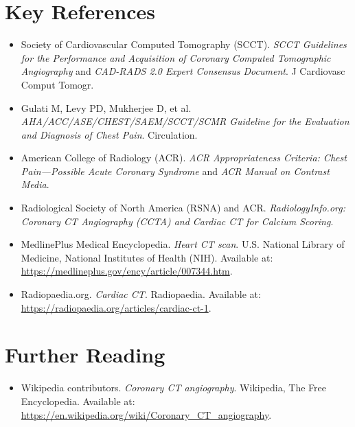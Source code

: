 \section{Key References}
\begin{itemize}
    \item Society of Cardiovascular Computed Tomography (SCCT). \textit{SCCT Guidelines for the Performance and Acquisition of Coronary Computed Tomographic Angiography} and \textit{CAD-RADS 2.0 Expert Consensus Document}. J Cardiovasc Comput Tomogr.
    \item Gulati M, Levy PD, Mukherjee D, et al. \textit{AHA/ACC/ASE/CHEST/SAEM/SCCT/SCMR Guideline for the Evaluation and Diagnosis of Chest Pain}. Circulation.
    \item American College of Radiology (ACR). \textit{ACR Appropriateness Criteria: Chest Pain---Possible Acute Coronary Syndrome} and \textit{ACR Manual on Contrast Media}.
    \item Radiological Society of North America (RSNA) and ACR. \textit{RadiologyInfo.org: Coronary CT Angiography (CCTA) and Cardiac CT for Calcium Scoring}.
    \item MedlinePlus Medical Encyclopedia. \textit{Heart CT scan}. U.S. National Library of Medicine, National Institutes of Health (NIH). Available at: \url{https://medlineplus.gov/ency/article/007344.htm}.
    \item Radiopaedia.org. \textit{Cardiac CT}. Radiopaedia. Available at: \url{https://radiopaedia.org/articles/cardiac-ct-1}.
\end{itemize}

\section{Further Reading}
\begin{itemize}
  \item Wikipedia contributors. \textit{Coronary CT angiography}. Wikipedia, The Free Encyclopedia. Available at: \url{https://en.wikipedia.org/wiki/Coronary_CT_angiography}.
\end{itemize}
